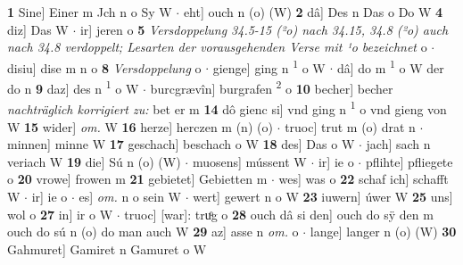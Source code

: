 \documentclass[8pt,a4paper,notitlepage]{article}
\begin{document}
\begin{table}[ht]
\begin{minipage}[t]{0.5\linewidth}
\textbf{1} Sine] Einer m Jch n o Sy W  $\cdot$ eht] ouch n (o) (W) \textbf{2} dâ] Des n Das o Do W \textbf{4} diz] Das W  $\cdot$ ir] jeren o \textbf{5} \textit{Versdoppelung 34.5-15 (²o) nach 34.15, 34.8 (²o) auch nach 34.8 verdoppelt; Lesarten der vorausgehenden Verse mit ¹o bezeichnet} o   $\cdot$ disiu] dise m n o \textbf{8} \textit{Versdoppelung} o   $\cdot$ gienge] ging n \textsuperscript{1}\hspace{-1.3mm} o W  $\cdot$ dâ] do m \textsuperscript{1}\hspace{-1.3mm} o W der do n \textbf{9} daz] des n \textsuperscript{1}\hspace{-1.3mm} o W  $\cdot$ burcgrævîn] burgrafen \textsuperscript{2}\hspace{-1.3mm} o \textbf{10} becher] becher \textit{nachträglich korrigiert zu:} bet er m \textbf{14} dô gienc si] vnd ging n \textsuperscript{1}\hspace{-1.3mm} o vnd gieng von W \textbf{15} wider] \textit{om.} W \textbf{16} herze] herczen m (n) (o)  $\cdot$ truoc] trut m (o) drat n  $\cdot$ minnen] minne W \textbf{17} geschach] beschach o W \textbf{18} des] Das o W  $\cdot$ jach] sach n veriach W \textbf{19} die] Sú n (o) (W)  $\cdot$ muosens] mússent W  $\cdot$ ir] ie o  $\cdot$ pflihte] pfliegete o \textbf{20} vrowe] frowen m \textbf{21} gebietet] Gebietten m  $\cdot$ wes] was o \textbf{22} schaf ich] schafft W  $\cdot$ ir] ie o  $\cdot$ es] \textit{om.} n o sein W  $\cdot$ wert] gewert n o W \textbf{23} iuwern] úwer W \textbf{25} uns] wol o \textbf{27} in] ir o W  $\cdot$ truoc] [war]: truͦg o \textbf{28} ouch dâ si den] ouch do sÿ den m ouch do sú n (o) do man auch W \textbf{29} az] asse n \textit{om.} o  $\cdot$ lange] langer n (o) (W) \textbf{30} Gahmuret] Gamiret n Gamuret o W \newline
\end{minipage}
\end{table}
\newpage
\end{document}
